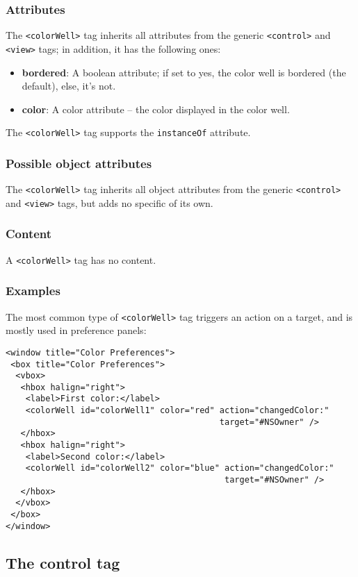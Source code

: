 \subsubsection{Attributes}
The \texttt{<colorWell>} tag inherits all attributes from the generic
\texttt{<control>} and \texttt{<view>} tags; in addition, it has 
the following ones:
\begin{itemize}
\item {\bf bordered}: A boolean attribute; if set to yes, the color
  well is bordered (the default), else, it's not.
\item {\bf color}: A color attribute -- the color displayed in the
  color well.
\end{itemize}

The \texttt{<colorWell>} tag supports the \texttt{instanceOf} attribute.

\subsubsection{Possible object attributes}
The \texttt{<colorWell>} tag inherits all object attributes from the
generic \texttt{<control>} and \texttt{<view>} tags, but adds no
specific of its own.

\subsubsection{Content}
A \texttt{<colorWell>} tag has no content.

\subsubsection{Examples}
The most common type of \texttt{<colorWell>} tag triggers an action on
a target, and is mostly used in preference panels:
\begin{verbatim}
<window title="Color Preferences">
 <box title="Color Preferences">
  <vbox>
   <hbox halign="right">
    <label>First color:</label>
    <colorWell id="colorWell1" color="red" action="changedColor:" 
                                           target="#NSOwner" />
   </hbox>
   <hbox halign="right">
    <label>Second color:</label>
    <colorWell id="colorWell2" color="blue" action="changedColor:" 
                                            target="#NSOwner" />
   </hbox>
  </vbox>
 </box>
</window>
\end{verbatim}

\subsection{The control tag}

